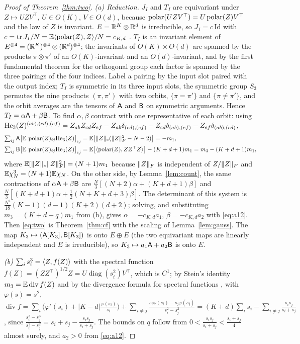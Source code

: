 \begin{proof}[Proof of Theorem~\ref{thm:two}]
\emph{(a) Reduction.} $J_I$ and $T_I$ are equivariant under $Z\mapsto UZV^\top$, $U\in O(K)$, $V\in O(d)$, because
$\operatorname{polar}(UZV^\top)=U\operatorname{polar}(Z)V^\top$ and the law of $Z$ is invariant. $E=\mathbb{R}^K\otimes\mathbb{R}^d$ is irreducible, so
$J_I=c\,\mathrm{Id}$ with $c=\operatorname{tr} J_I/N=\mathbb{E}\langle \operatorname{polar}(Z), Z\rangle/N=c_{K,d}$ \citep{xie2026muon,chen2026when}. $T_I$ is an invariant element of
$E^{\otimes4}=(\mathbb{R}^K)^{\otimes4}\otimes(\mathbb{R}^d)^{\otimes4}$; the invariants of $O(K)\times O(d)$ are spanned by the
products $\pi\otimes\pi'$ of an $O(K)$-invariant and an $O(d)$-invariant, and by the first fundamental theorem for the
orthogonal group each factor is spanned by the three pairings of the four indices. Label a pairing by the input slot
paired with the output index; $T_I$ is symmetric in its three input slots, the symmetric group $S_3$ permutes the nine
products $(\pi,\pi')$ with two orbits, $\{\pi=\pi'\}$ and $\{\pi\ne\pi'\}$, and the orbit averages are the tensors of
$\mathsf{A}$ and $\mathsf{B}$ on symmetric arguments. Hence $T_I=\alpha\mathsf{A}+\beta\mathsf{B}$. To find $\alpha,\beta$ contract with one representative of each orbit:
using $\mathrm{He}_3(Z)^{(ab),(cd),(ef)}=Z_{ab}Z_{cd}Z_{ef}-Z_{ab}\delta_{(cd),(ef)}-Z_{cd}\delta_{(ab),(ef)}-Z_{ef}\delta_{(ab),(cd)}$,
\begin{align*}
\textstyle\sum_{ij}\mathsf{A}\big[\mathbb{E}\,\operatorname{polar}(Z)_{ij}\mathrm{He}_3(Z)\big]_{ij}&=\mathbb{E}\big[\|Z\|_{*}(\|Z\|_{F}^2-N-2)\big]=-m_1,\\
\textstyle\sum_{ij}\mathsf{B}\big[\mathbb{E}\,\operatorname{polar}(Z)_{ij}\mathrm{He}_3(Z)\big]_{ij}&=\mathbb{E}\big[\langle \operatorname{polar}(Z), ZZ^\top Z\rangle\big]-(K+d+1)m_1=m_3-(K+d+1)m_1,
\end{align*}
where $\mathbb{E}[\|Z\|_{*}\|Z\|_{F}^2]=(N+1)m_1$ because $\|Z\|_{F}$ is independent of $Z/\|Z\|_{F}$ and $\mathbb{E}\chi_N^3=(N+1)\mathbb{E}\chi_N$. On the
other side, by Lemma~\ref{lem:count}, the same contractions of $\alpha\mathsf{A}+\beta\mathsf{B}$ are
$\frac N3[(N+2)\alpha+(K+d+1)\beta]$ and $\frac N3[(K+d+1)\alpha+\frac12(N+K+d+3)\beta]$. The determinant of this system
is $\frac{N^2}{18}(K-1)(d-1)(K+2)(d+2)$; solving, and substituting $m_3=(K+d-q)m_1$ from (b), gives
$\alpha=-c_{K,d}a_1$, $\beta=-c_{K,d}a_2$ with \eqref{eq:a12}. Then \eqref{eq:two} is Theorem~\ref{thm:cf} with the scaling
of Lemma~\ref{lem:gauss}. The map $K_3\mapsto(\mathsf{A}[K_3],\mathsf{B}[K_3])$ is onto $E\oplus E$ (the two equivariant maps are
linearly independent and $E$ is irreducible), so $K_3\mapsto a_1\mathsf{A}+a_2\mathsf{B}$ is onto $E$.

\emph{(b)} $\sum_is_i^3=\langle Z, f(Z)\rangle$ with the spectral function $f(Z)=(ZZ^\top)^{1/2}Z=U\operatorname{diag}(s_i^2)V^\top$,
which is $C^1$; by Stein's identity $m_3=\mathbb{E}\operatorname{div}f(Z)$ and by the divergence formula for spectral functions
\citep{candes}, with $\varphi(s)=s^2$,
$\operatorname{div}f=\sum_i\big(\varphi'(s_i)+|K-d|\frac{\varphi(s_i)}{s_i}\big)+\sum_{i\ne j}\frac{s_i\varphi(s_i)-s_j\varphi(s_j)}{s_i^2-s_j^2}
=(K+d)\sum_is_i-\sum_{i\ne j}\frac{s_is_j}{s_i+s_j}$, since
$\frac{s_i^3-s_j^3}{s_i^2-s_j^2}=s_i+s_j-\frac{s_is_j}{s_i+s_j}$. The bounds on $q$ follow from
$0<\frac{s_is_j}{s_i+s_j}<\frac{s_i+s_j}4$ almost surely, and $a_2>0$ from \eqref{eq:a12}.


\end{proof}
